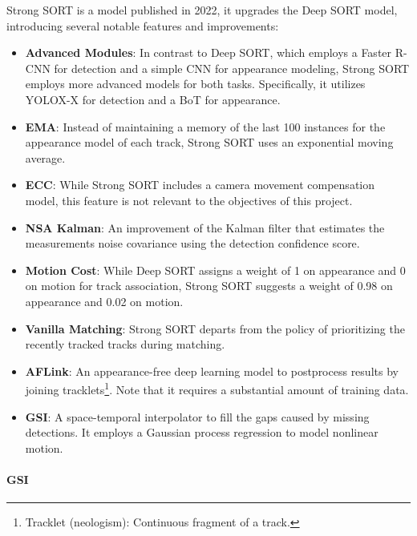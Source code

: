 
{
    Strong SORT\cite{du2023strongsort} is a model published in 2022, 
    it upgrades the Deep SORT model, 
    introducing several notable features and improvements:
}

\begin{itemize}
    \item {
        \textbf{Advanced Modules}: 
        In contrast to Deep SORT, which employs a Faster R-CNN\cite{7485869, s23156887} for detection and a simple \ac{CNN} for appearance modeling, 
        Strong SORT employs more advanced models for both tasks. 
        Specifically, it utilizes YOLOX-X for detection and a \ac{BoT}\cite{Luo_2019_CVPR_Workshops} for appearance.
    }
    \item {
        \textbf{\ac{EMA}}: 
        Instead of maintaining a memory of the last 100 instances for the appearance model of each track, Strong SORT uses an exponential moving average.
    }
    \item {
        \textbf{\ac{ECC}}: 
        While Strong SORT includes a camera movement compensation model, 
        this feature is not relevant to the objectives of this project.
    }
    \item {
        \textbf{NSA Kalman}: 
        An improvement of the Kalman filter that estimates the measurements noise covariance using the detection confidence score.
    }
    \item {
        \textbf{Motion Cost}: 
        While Deep SORT assigns a weight of 1 on appearance and 0 on motion for track association, 
        Strong SORT suggests a weight of 0.98 on appearance and 0.02 on motion.
    }
    \item {
        \textbf{Vanilla Matching}: Strong SORT departs from the policy of prioritizing the recently tracked tracks during matching.
    }
    \item {
        \textbf{AFLink}: 
        An appearance-free deep learning model to postprocess results by joining tracklets\footnote{Tracklet (neologism): Continuous fragment of a track.}. 
        Note that it requires a substantial amount of training data.
    }
    \item {
        \textbf{\ac{GSI}}: 
        A space-temporal interpolator to fill the gaps caused by missing detections. 
        It employs a Gaussian process regression to model nonlinear motion.
    }
\end{itemize}

\paragraph{\acl{GSI}}

